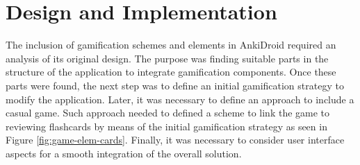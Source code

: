 
\chapter{Design and Implementation} %

\label{desi} %

The inclusion of gamification schemes and elements in AnkiDroid required an analysis of its original design. The purpose was finding suitable parts in the structure of the application to integrate gamification components. Once these parts were found, the next step was to define an initial gamification strategy to modify the application. Later, it was necessary to define an approach to include a casual game. Such approach needed to defined a scheme to link the game to reviewing flashcards by means of the initial gamification strategy as seen in Figure \ref{fig:game-elem-cards}. Finally, it was necessary to consider user interface aspects for a smooth integration of the overall solution.

